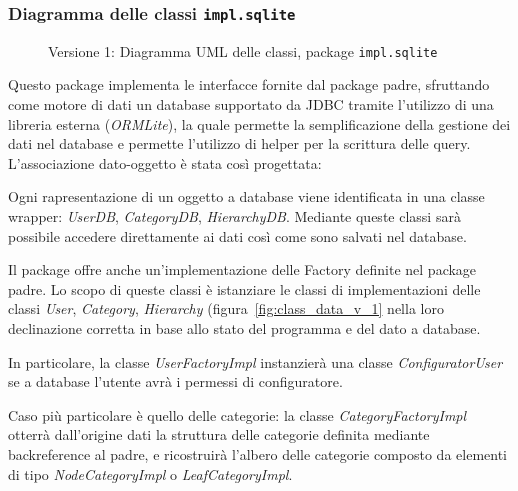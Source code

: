 \subsubsection{Diagramma delle classi \texttt{impl.sqlite}}
\vspace{0.5cm}
\begin{figure}[H]
    \centering
    \caption{Versione 1: Diagramma UML delle classi, package \texttt{impl.sqlite}}
    \label{fig:class_db_v_1}
\end{figure}

Questo package implementa le interfacce fornite dal package padre, sfruttando come motore di dati un database supportato da JDBC
tramite l'utilizzo di una libreria esterna (\textit{ORMLite}), la quale permette la semplificazione della gestione dei dati nel database
e permette l'utilizzo di helper per la scrittura delle query. L'associazione dato-oggetto è stata così progettata:

Ogni rapresentazione di un oggetto a database viene identificata in una classe wrapper: \textit{UserDB}, \textit{CategoryDB}, \textit{HierarchyDB}.
Mediante queste classi sarà possibile accedere direttamente ai dati così come sono salvati nel database.

Il package offre anche un'implementazione delle Factory definite nel package padre. Lo scopo di queste classi
è istanziare le classi di implementazioni delle classi \textit{User}, \textit{Category}, \textit{Hierarchy} (figura~\ref{fig:class_data_v_1}
nella loro declinazione corretta in base allo stato del programma e del dato a database.

In particolare, la classe \textit{UserFactoryImpl} instanzierà una classe \textit{ConfiguratorUser} se a database l'utente avrà
i permessi di configuratore.

Caso più particolare è quello delle categorie:
la classe \textit{CategoryFactoryImpl} otterrà dall'origine dati la struttura delle categorie definita mediante backreference al padre, 
e ricostruirà l'albero delle categorie composto da elementi di tipo \textit{NodeCategoryImpl} o \textit{LeafCategoryImpl}.
